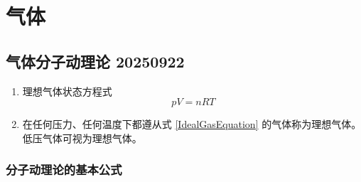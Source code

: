 \section{气体}

\subsection{气体分子动理论 20250922}

\begin{enumerate}
    \item 理想气体状态方程式
    \begin{equation}
        pV = nRT
        \label{IdealGasEquation}
    \end{equation}
    \item 在任何压力、任何温度下都遵从式 \eqref{IdealGasEquation} 的气体称为理想气体。低压气体可视为理想气体。
\end{enumerate}

\subsubsection{分子动理论的基本公式}

